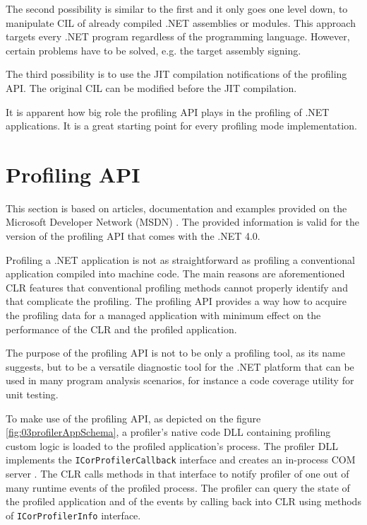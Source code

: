 The second possibility is similar to the first and it only goes one level down, to manipulate CIL of already compiled .NET assemblies or modules. This approach targets every .NET program regardless of the programming language. However, certain problems have to be solved, e.g. the target assembly signing.

The third possibility is to use the JIT compilation notifications of the profiling API. The original CIL can be modified before the JIT compilation.

It is apparent how big role the profiling API plays in the profiling of .NET applications. It is a great starting point for every profiling mode implementation.

\section{Profiling API}
This section is based on articles, documentation and examples provided on the Microsoft Developer Network (MSDN) \cite{ProfMSDN}. The provided information is valid for the version of the profiling API that comes with the .NET 4.0. 

Profiling a .NET application is not as straightforward as profiling a conventional application compiled into machine code. The main reasons are aforementioned CLR features that conventional profiling methods cannot properly identify and that complicate the profiling. The profiling API provides a way how to acquire the profiling data for a managed application with minimum effect on the performance of the CLR and the profiled application. 

The purpose of the profiling API is not to be only a profiling tool, as its name suggests, but to be a versatile diagnostic tool for the .NET platform that can be used in many program analysis scenarios, for instance a code coverage utility for unit testing.

To make use of the profiling API, as depicted on the figure \ref{fig:03profilerAppSchema}, a profiler's native code DLL containing profiling custom logic is loaded to the profiled application's process. The profiler DLL implements the \texttt{ICorProfilerCallback} interface and creates an in-process COM server . The CLR calls methods in that interface to notify profiler of one out of many runtime events of the profiled process. The profiler can query the state of the profiled application and of the events by calling back into CLR using methods of \texttt{ICorProfilerInfo} interface.

